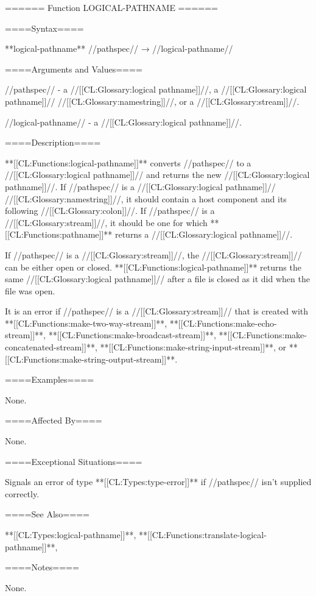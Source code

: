 ====== Function LOGICAL-PATHNAME ======

====Syntax====

**logical-pathname** //pathspec// → //logical-pathname//

====Arguments and Values====

//pathspec// - a //[[CL:Glossary:logical pathname]]//, a //[[CL:Glossary:logical pathname]]// //[[CL:Glossary:namestring]]//, or a //[[CL:Glossary:stream]]//.

//logical-pathname// - a //[[CL:Glossary:logical pathname]]//.

====Description====

**[[CL:Functions:logical-pathname]]** converts //pathspec// to a //[[CL:Glossary:logical pathname]]// and returns the new //[[CL:Glossary:logical pathname]]//. If //pathspec// is a //[[CL:Glossary:logical pathname]]// //[[CL:Glossary:namestring]]//, it should contain a host component and its following //[[CL:Glossary:colon]]//. If //pathspec// is a //[[CL:Glossary:stream]]//, it should be one for which **[[CL:Functions:pathname]]** returns a //[[CL:Glossary:logical pathname]]//.


If //pathspec// is a //[[CL:Glossary:stream]]//, the //[[CL:Glossary:stream]]// can be either open or closed. **[[CL:Functions:logical-pathname]]** returns the same //[[CL:Glossary:logical pathname]]// after a file is closed as it did when the file was open.

It is an error if //pathspec// is a //[[CL:Glossary:stream]]// that is created with **[[CL:Functions:make-two-way-stream]]**, **[[CL:Functions:make-echo-stream]]**, **[[CL:Functions:make-broadcast-stream]]**, **[[CL:Functions:make-concatenated-stream]]**, **[[CL:Functions:make-string-input-stream]]**, or **[[CL:Functions:make-string-output-stream]]**.

====Examples====

None.

====Affected By====

None.

====Exceptional Situations====

Signals an error of type **[[CL:Types:type-error]]** if //pathspec// isn't supplied correctly.

====See Also====

**[[CL:Types:logical-pathname]]**, **[[CL:Functions:translate-logical-pathname]]**, {\secref\LogicalPathnames}

====Notes====

None.

  
